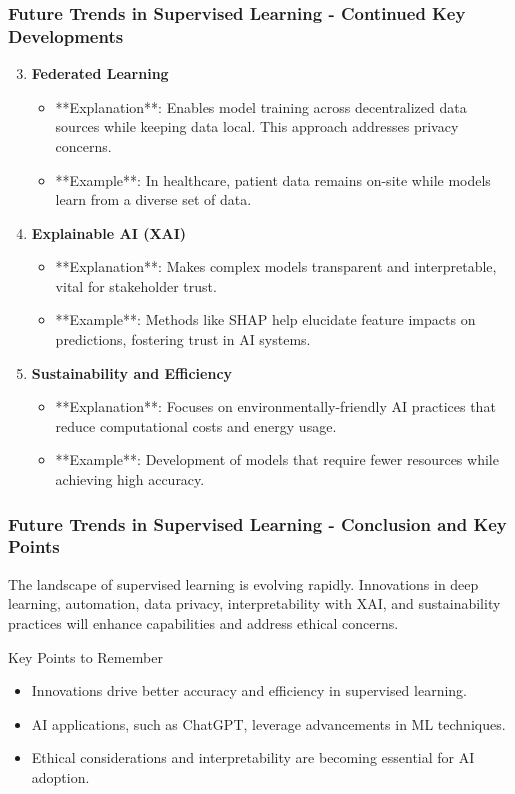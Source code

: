 \documentclass[aspectratio=169]{beamer}
\begin{document}
\begin{frame}[fragile]
    \frametitle{Future Trends in Supervised Learning - Continued Key Developments}
    \begin{enumerate}
        \setcounter{enumi}{2}
        \item \textbf{Federated Learning}
            \begin{itemize}
                \item **Explanation**: Enables model training across decentralized data sources while keeping data local. This approach addresses privacy concerns.
                \item **Example**: In healthcare, patient data remains on-site while models learn from a diverse set of data.
            \end{itemize}
        
        \item \textbf{Explainable AI (XAI)}
            \begin{itemize}
                \item **Explanation**: Makes complex models transparent and interpretable, vital for stakeholder trust.
                \item **Example**: Methods like SHAP help elucidate feature impacts on predictions, fostering trust in AI systems.
            \end{itemize}
        
        \item \textbf{Sustainability and Efficiency}
            \begin{itemize}
                \item **Explanation**: Focuses on environmentally-friendly AI practices that reduce computational costs and energy usage.
                \item **Example**: Development of models that require fewer resources while achieving high accuracy.
            \end{itemize}
    \end{enumerate}
\end{frame}

\begin{frame}[fragile]
    \frametitle{Future Trends in Supervised Learning - Conclusion and Key Points}
    The landscape of supervised learning is evolving rapidly. Innovations in deep learning, automation, data privacy, interpretability with XAI, and sustainability practices will enhance capabilities and address ethical concerns.

    \begin{block}{Key Points to Remember}
        \begin{itemize}
            \item Innovations drive better accuracy and efficiency in supervised learning.
            \item AI applications, such as ChatGPT, leverage advancements in ML techniques.
            \item Ethical considerations and interpretability are becoming essential for AI adoption.
        \end{itemize}
    \end{block}
\end{frame}
\end{document}

